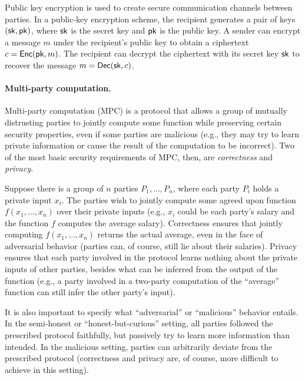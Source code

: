 Public key encryption is used to create secure communication channels between
parties. In a public-key encryption scheme, the recipient generates a pair of
keys $(\mathsf{sk}, \mathsf{pk})$, where $\mathsf{sk}$ is the secret key and $\mathsf{pk}$ is the public key. A
sender can encrypt a message $m$ under the recipient's public key to obtain a
ciphertext $c = \mathsf{Enc}(\mathsf{pk}, m)$. The recipient can decrypt the ciphertext with its
secret key $\mathsf{sk}$ to recover the message $m = \mathsf{Dec}(\mathsf{sk}, c)$.

\paragraph{Multi-party computation.}

Multi-party computation (MPC) is a protocol that allows a group of mutually
distrusting parties to jointly compute some function while preserving certain
security properties, even if some parties are malicious (e.g., they may try to
learn private information or cause the result of the computation to be
incorrect). Two of the most basic security requirements of MPC, then, are
\emph{correctness} and \emph{privacy}.

Suppose there is a group of $n$ parties $P_1, \ldots, P_n$, where each party
$P_i$ holds a private input $x_i$. The parties wish to jointly compute some
agreed upon function $f(x_1, \ldots, x_n)$ over their private inputs (e.g.,
$x_i$ could be each party's salary and the function $f$ computes the average
salary). Correctness ensures that jointly computing $f(x_1, \ldots, x_n)$
returns the actual average, even in the face of adversarial behavior (parties
can, of course, still lie about their salaries). Privacy ensures that each party
involved in the protocol learns nothing about the private inputs of other
parties, besides what can be inferred from the output of the function (e.g., a
party involved in a two-party computation of the ``average'' function can still
infer the other party's input).

It is also important to specify what ``adversarial'' or ``malicious'' behavior
entails. In the semi-honest or ``honest-but-curious'' setting, all parties
followed the prescribed protocol faithfully, but passively try to learn more
information than intended. In the malicious setting, parties can arbitrarily
deviate from the prescribed protocol (correctness and privacy are, of course,
more difficult to achieve in this setting).

